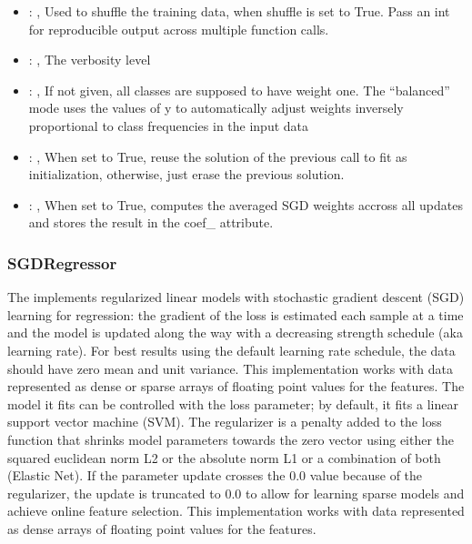 \begin{itemize}
    \item {}: , 
      Used to shuffle the training data, when shuffle is set to
      True. Pass an int for reproducible output across multiple function calls.

    \item {}: , 
      The verbosity level

    \item {}: \xmlDesc{[balanced]}, 
      If not given, all classes are supposed to have weight one.
      The “balanced” mode uses the values of y to automatically adjust weights
      inversely proportional to class frequencies in the input data

    \item {}: , 
      When set to True, reuse the solution of the previous call
      to fit as initialization, otherwise, just erase the previous solution.

    \item {}: , 
      When set to True, computes the averaged SGD weights accross
      all updates and stores the result in the coef\_ attribute.
  \end{itemize}


\subsubsection{SGDRegressor}
  The  implements regularized linear models with stochastic
  gradient descent (SGD) learning for regression: the gradient of the loss is estimated each sample
  at                         a time and the model is updated along the way with a decreasing
  strength schedule                         (aka learning rate). For best results using the default
  learning rate schedule, the                         data should have zero mean and unit variance.
  This implementation works with data represented as dense or sparse arrays of floating
  point values for the features. The model it fits can be controlled with the loss parameter;
  by default, it fits a linear support vector machine (SVM).                         The regularizer
  is a penalty added to the loss function that shrinks model parameters towards
  the zero vector using either the squared euclidean norm L2 or the absolute norm L1 or a
  combination of both (Elastic Net). If the parameter update crosses the 0.0 value because
  of the regularizer, the update is truncated to $0.0$ to allow for learning sparse models and
  achieve online feature selection.                         This implementation works with data
  represented as dense arrays of floating point values for the features.

